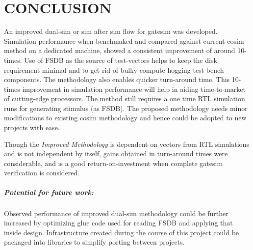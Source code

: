 \chapter{CONCLUSION}
\label{chap:conclusion}
An improved dual-sim or sim after sim flow for gatesim was developed. Simulation performance when benchmaked and compared against current cosim method on a dedicated machine, showed a consistent improvement of around 10-times. Use of FSDB as the source of test-vectors helps to keep the disk requirement minimal and to get rid of bulky compute hogging test-bench components. The methodology also enables quicker turn-around time. This 10-times improvement in simulation performance will help in aiding time-to-market of cutting-edge processors. The method still requires a one time RTL simulation runs for generating stimulus (as FSDB). The proposed methodology needs minor modifications to existing cosim methodology and hence could be adopted to new projects with ease.

Though the {\it Improved Methodology} is dependent on vectors from RTL simulations and is not independent by itself, gains obtained in turn-around times were considerable, and is a good return-on-investment when complete gatesim verification is considered.

\paragraph{Potential for future work:}Observed performance of improved dual-sim methodology could be further increased by optimizing glue code used for reading FSDB and applying that inside design. Infrastructure created during the course of this project could be packaged into libraries to simplify porting between projects.
